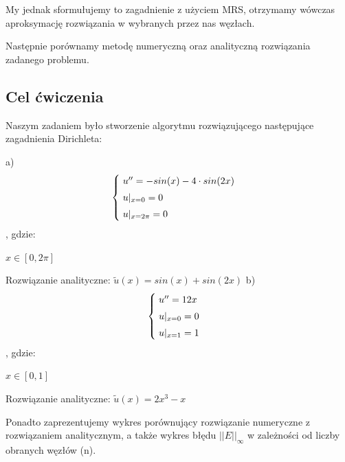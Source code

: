 My jednak sformułujemy to zagadnienie z użyciem MRS, otrzymamy wówczas aproksymację rozwiązania w wybranych przez nas węzłach.

Następnie porównamy metodę numeryczną oraz analityczną rozwiązania zadanego problemu.

\subsection{Cel ćwiczenia}

Naszym zadaniem było stworzenie algorytmu rozwiązującego następujące zagadnienia Dirichleta:

a)
\[
\begin{cases}
\vspace{0.1cm} 
\hspace{0,1cm}u''=-sin(x)-4\cdot sin(2x) \\
\vspace{0.1cm}
\hspace{0,1cm}u|_{x=0}=0 \\
\hspace{0,1cm}u|_{x=2\pi}=0
\end{cases}
\]
, gdzie:

$x\in [0,2\pi]$

Rozwiązanie analityczne: $\widetilde{u}(x) = sin(x) +sin(2x)$
\newpage
b)
\[
\begin{cases}
\vspace{0.1cm} 
\hspace{0,1cm}u''=12x \\
\vspace{0.1cm}
\hspace{0,1cm}u|_{x=0}=0 \\
\hspace{0,1cm}u|_{x=1}=1
\end{cases}
\]
, gdzie:

$x\in [0,1]$

Rozwiązanie analityczne: $\widetilde{u}(x) = 2x^{3}-x$

\vspace{0.3cm}
Ponadto zaprezentujemy wykres porównujący rozwiązanie numeryczne z rozwiązaniem analitycznym, a także wykres błędu $||E||_{\infty}$ w zależności od liczby obranych węzłów (n).

